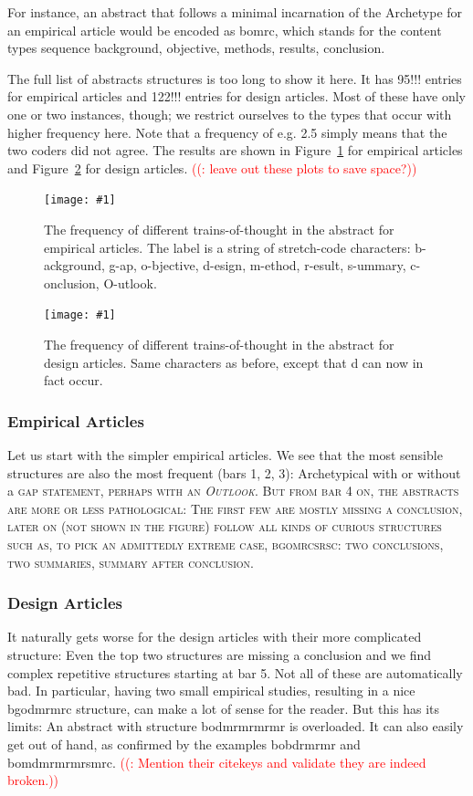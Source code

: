 \documentclass[10pt,journal,compsoc]{IEEEtran}
\newcommand{\Plot}[2]{%
	\begin{figure}[htb]%
		\centering\texttt{[image: \#1]}%
		\vspace{-4mm}\caption{#2}\label{#1}%
	\end{figure}}
\newcommand{\Cb}[1]{\bgroup\scshape #1\egroup}  %
\newcounter{todonumber}
\newcommand{\Todo}[1]{\stepcounter{todonumber}\textcolor{red}{\sffamily ((\arabic{todonumber}: #1))}}
\begin{document}
For instance, an abstract that follows a minimal incarnation of the Archetype
for an empirical article would be encoded as bomrc, which stands for
the content types sequence background, objective, methods, results, conclusion.

The full list of abstracts structures is too long to show it here.
It has 95!!! entries for empirical articles and 122!!! entries for design articles.
Most of these have only one or two instances, though;
we restrict ourselves to the types that occur with higher frequency here.
Note that a frequency of e.g. 2.5 simply means that the two coders did not agree.
The results are shown in
Figure~\ref{ab_topicstructure_freqs_empir} for empirical articles and
Figure~\ref{ab_topicstructure_freqs_design} for design articles.
\Todo{leave out these plots to save space?}

\Plot{ab_topicstructure_freqs_empir}{%
  The frequency of different trains-of-thought in the abstract for empirical articles.
  The label is a string of stretch-code characters:
  b-ackground, g-ap, o-bjective, d-esign, m-ethod, r-esult, s-ummary, c-onclusion, O-utlook.}
\Plot{ab_topicstructure_freqs_design}{%
  The frequency of different trains-of-thought in the abstract for design articles.
  Same characters as before, except that d can now in fact occur.}



\subsubsection{Empirical Articles}

Let us start with the simpler empirical articles.
We see that the most sensible structures are also the most frequent (bars 1, 2, 3):
Archetypical with or without a \Cb{gap} statement, perhaps with an \emph{Outlook}.
But from bar 4 on, the abstracts are more or less pathological:
The first few are mostly missing a conclusion, later on (not shown in the figure)
follow all kinds of curious structures such as, to pick an admittedly extreme case,
bgomrcsrsc: two conclusions, two summaries, summary after conclusion.

\subsubsection{Design Articles}

It naturally gets worse for the design articles with their more complicated structure:
Even the top two structures are missing a conclusion
and we find complex repetitive structures starting at bar 5.
Not all of these are automatically bad.
In particular, having two small empirical studies, resulting in a nice bgodmrmrc structure,
can make a lot of sense for the reader.
But this has its limits: An abstract with structure bodmrmrmrmr is overloaded.
It can also easily get out of hand, as confirmed by the examples bobdrmrmr and bomdmrmrmrsmrc.
\Todo{Mention their citekeys and validate they are indeed broken.}
\end{document}
